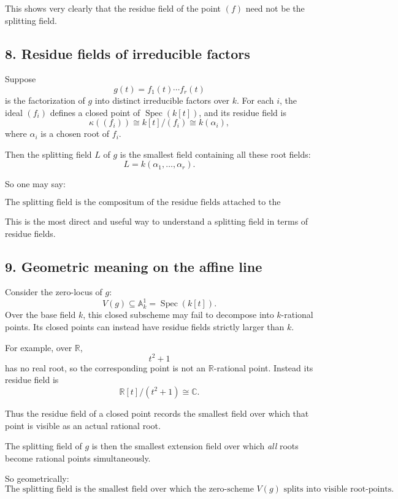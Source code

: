 \documentclass[12pt,a4paper]{article}
\theoremstyle{plain}
\theoremstyle{definition}      %
\begin{document}
This shows very clearly that the residue field of the point \((f)\) need not be the splitting field.

\subsection*{8. Residue fields of irreducible factors}

Suppose
\[
g(t)=f_1(t)\cdots f_r(t)
\]
is the factorization of \(g\) into distinct irreducible factors over \(k\). For each \(i\), the ideal \((f_i)\) defines a closed point of \(\operatorname{Spec}(k[t])\), and its residue field is
\[
\kappa((f_i))\cong k[t]/(f_i)\cong k(\alpha_i),
\]
where \(\alpha_i\) is a chosen root of \(f_i\).

Then the splitting field \(L\) of \(g\) is the smallest field containing all these root fields:
\[
L=k(\alpha_1,\dots,\alpha_r).
\]

So one may say:

\[
\boxed{\text{The splitting field is the compositum of the residue fields attached to the irreducible factors.}}
\]

This is the most direct and useful way to understand a splitting field in terms of residue fields.

\subsection*{9. Geometric meaning on the affine line}

Consider the zero-locus of \(g\):
\[
V(g)\subseteq \mathbb A^1_k=\operatorname{Spec}(k[t]).
\]
Over the base field \(k\), this closed subscheme may fail to decompose into \(k\)-rational points. Its closed points can instead have residue fields strictly larger than \(k\).

For example, over \(\mathbb R\),
\[
t^2+1
\]
has no real root, so the corresponding point is not an \(\mathbb R\)-rational point. Instead its residue field is
\[
\mathbb R[t]/(t^2+1)\cong \mathbb C.
\]

Thus the residue field of a closed point records the smallest field over which that point is visible as an actual rational root.

The splitting field of \(g\) is then the smallest extension field over which \emph{all} roots become rational points simultaneously.

So geometrically:
\[
\boxed{\text{The splitting field is the smallest field over which the zero-scheme }V(g)\text{ splits into visible root-points.}}
\]
\end{document}
